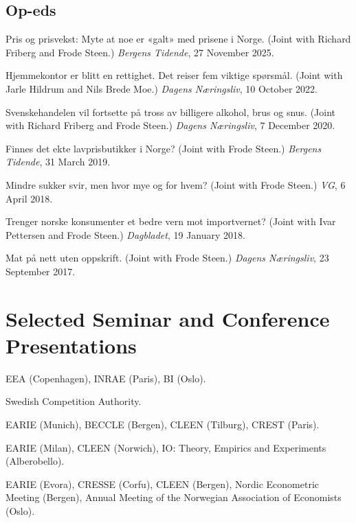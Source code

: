 \documentclass[10pt,a4paper]{article}
\begin{document}
\subsection*{Op-eds}

\begin{pubs}
  \item Pris og prisvekst: Myte at noe er «galt» med prisene i Norge. (Joint
        with Richard Friberg and Frode Steen.) \emph{Bergens Tidende},
        27 November 2025.

  \item Hjemmekontor er blitt en rettighet. Det reiser fem viktige spørsmål.
        (Joint with Jarle Hildrum and Nils Brede Moe.)
        \emph{Dagens Næringsliv}, 10 October 2022.

  \item Svenskehandelen vil fortsette på tross av billigere alkohol, brus og
        snus. (Joint with Richard Friberg and Frode Steen.)
        \emph{Dagens Næringsliv}, 7 December 2020.

  \item Finnes det ekte lavprisbutikker i Norge? (Joint with Frode Steen.)
        \emph{Bergens Tidende}, 31 March 2019.

  \item Mindre sukker svir, men hvor mye og for hvem? (Joint with Frode Steen.)
        \emph{VG}, 6 April 2018.

  \item Trenger norske konsumenter et bedre vern mot importvernet? (Joint with
        Ivar Pettersen and Frode Steen.) \emph{Dagbladet}, 19 January 2018.

  \item Mat på nett uten oppskrift. (Joint with Frode Steen.)
        \emph{Dagens Næringsliv}, 23 September 2017.
\end{pubs}

\section{Selected Seminar and Conference Presentations}

\begin{years}
  \item[\textbf{2021}] EEA (Copenhagen), INRAE (Paris), BI (Oslo).
  \item[\textbf{2016}] Swedish Competition Authority.
  \item[\textbf{2015}] EARIE (Munich), BECCLE (Bergen), CLEEN (Tilburg),
        CREST (Paris).
  \item[\textbf{2014}] EARIE (Milan), CLEEN (Norwich), IO: Theory, Empirics and
        Experiments (Alberobello).
  \item[\textbf{2013}] EARIE (Evora), CRESSE (Corfu), CLEEN (Bergen), Nordic
        Econometric Meeting (Bergen), Annual Meeting of the Norwegian
        Association of Economists (Oslo).
\end{years}
\end{document}
